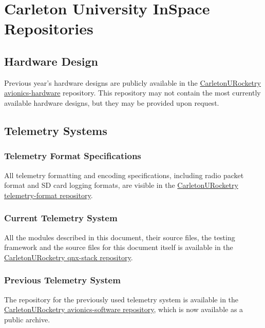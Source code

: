 \appendix

\section{Carleton University InSpace Repositories}

\subsection{Hardware Design}

Previous year's hardware designs are publicly available in the
\href{https://github.com/CarletonURocketry/avionics-hardware}{CarletonURocketry avionics-hardware} repository. This
repository may not contain the most currently available hardware designs, but they may be provided upon request.

\subsection{Telemetry Systems}

\subsubsection{Telemetry Format Specifications} \label{a:telem-format}

All telemetry formatting and encoding specifications, including radio packet format and SD card logging formats, are
visible in the \href{https://github.com/CarletonURocketry/telemetry-format}{CarletonURocketry telemetry-format
    repository}.

\subsubsection{Current Telemetry System} \label{a:cur-system}

All the modules described in this document, their source files, the testing framework and the source files for this
document itself is available in the \href{https://github.com/CarletonURocketry/qnx-stack}{CarletonURocketry qnx-stack
    repository}.

\subsubsection{Previous Telemetry System} \label{a:prev-system}

The repository for the previously used telemetry system is available in the
\href{https://github.com/CarletonURocketry/avionics-software}{CarletonURocketry avionics-software repository}, which is
now available as a public archive.

